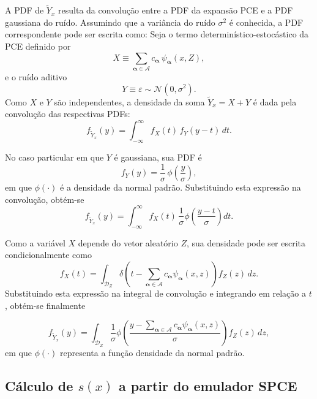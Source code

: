A PDF de \(\tilde{Y}_x\) resulta da convolução entre a PDF da expansão PCE e a PDF gaussiana do ruído.  
Assumindo que a variância do ruído \(\sigma^2\) é conhecida, a PDF correspondente pode ser escrita como:
Seja o termo determinístico-estocástico da PCE definido por
\[
X \equiv 
\sum_{\boldsymbol{\alpha} \in \mathcal{A}}
c_{\boldsymbol{\alpha}} \, 
\psi_{\boldsymbol{\alpha}}(x, Z),
\]
e o ruído aditivo
\[
Y \equiv \varepsilon \sim \mathcal{N}(0,\sigma^{2}).
\]
Como \(X\) e \(Y\) são independentes, a densidade da soma
\(\tilde{Y}_x = X + Y\) é dada pela convolução das respectivas PDFs:
\[
f_{\tilde{Y}_x}(y)
=
\int_{-\infty}^{\infty}
f_X(t)\, f_Y(y - t)\, dt.
\]

No caso particular em que \(Y\) é gaussiana, sua PDF é
\[
f_Y(y) = \frac{1}{\sigma}\,\phi\!\left(\frac{y}{\sigma}\right),
\]
em que \(\phi(\cdot)\) é a densidade da normal padrão. Substituindo esta
expressão na convolução, obtém-se
\[
f_{\tilde{Y}_x}(y)
=
\int_{-\infty}^{\infty}
f_X(t)\,
\frac{1}{\sigma}
\phi\!\left(
\frac{y - t}{\sigma}
\right)
dt.
\]

Como a variável \(X\) depende do vetor aleatório \(Z\), sua densidade
pode ser escrita condicionalmente como
\[
f_X(t)
=
\int_{\mathcal{D}_Z}
\delta\!\left(
t -
\sum_{\boldsymbol{\alpha} \in \mathcal{A}}
c_{\boldsymbol{\alpha}} \psi_{\boldsymbol{\alpha}}(x, z)
\right)
f_Z(z)\, dz.
\]
Substituindo esta expressão na integral de convolução e integrando em
relação a \(t\), obtém-se finalmente

\begin{equation}
f_{\tilde{Y}_x}(y) =
\int_{\mathcal{D}_Z}
\frac{1}{\sigma}
\phi\!\left(
\frac{
y -
\sum_{\boldsymbol{\alpha} \in \mathcal{A}} 
c_{\boldsymbol{\alpha}} \psi_{\boldsymbol{\alpha}}(x, z)
}{\sigma}
\right)
f_Z(z) \, dz,
\label{eq21}
\end{equation}
em que \(\phi(\cdot)\) representa a função densidade da normal padrão.
\subsection{Cálculo de \(s(x)\) a partir do emulador SPCE}

